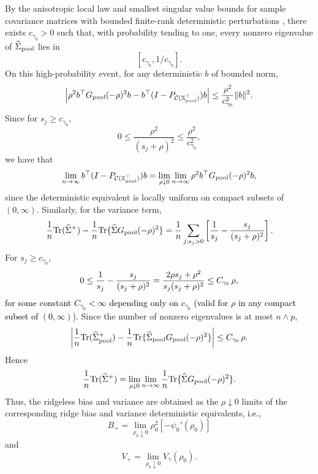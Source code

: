 \documentclass{article}
\theoremstyle{plain}
\theoremstyle{remark}
\def \Xm {\mathbb{X}_{\rm pool}}
\def \tr {\mathrm{Tr}}
\begin{document}


By the anisotropic local law \citep{knowles2017anisotropic} and smallest singular value bounds for sample covariance matrices with bounded finite-rank deterministic perturbations \citep{bai2010spectral}, there exists \(c_{\gamma_0}>0\) such that, with probability tending to one, every nonzero eigenvalue of \(\widehat\Sigma_{\rm pool}\) lies in
\[
[c_{\gamma_0},1/c_{\gamma_0}].
\]
On this high-probability event, for any deterministic $b$ of bounded norm,
\[
\left|
\rho^2 b^\top G_{\rm pool}(-\rho)^2b
-
b^\top(I-P_{\mathcal{C}(\textcolor{black}{\Xm^\top})})b
\right|
\le
\frac{\rho^2}{c_{\gamma_0}^2}\|b\|^2.
\]
Since for \(s_j\ge c_{\gamma_0}\),
\[
0\le
\frac{\rho^2}{(s_j+\rho)^2}
\le
\frac{\rho^2}{c_{\gamma_0}^2},
\]
we have that
\[
\lim_{n\to\infty}b^\top(I-P_{\mathcal{C}(\textcolor{black}{\Xm^\top})})b
=
\lim_{\rho\downarrow0}\lim_{n\to\infty}
\rho^2 b^\top G_{\rm pool}(-\rho)^2b,
\]
since the deterministic equivalent is locally uniform on compact subsets of $(0,\infty)$.
Similarly, for the variance term,
\[
\frac1n\tr(\widehat\Sigma^+)
-
\frac1n\tr\{\widehat\Sigma G_{\rm pool}(-\rho)^2\}
=
\frac1n\sum_{j:s_j>0}
\left[
\frac1{s_j}
-
\frac{s_j}{(s_j+\rho)^2}
\right].
\]
For \(s_j\ge c_{\gamma_0}\),
\[
0\le
\frac1{s_j}
-
\frac{s_j}{(s_j+\rho)^2}
=
\frac{2\rho s_j+\rho^2}{s_j(s_j+\rho)^2}
\le
\textcolor{black}{C_{\gamma_0}\,\rho,}
\]
\textcolor{black}{for some constant $C_{\gamma_0}<\infty$ depending only on $c_{\gamma_0}$ (valid for $\rho$ in any compact subset of $(0,\infty)$).} Since the number of nonzero eigenvalues is at most \(n\wedge p\),
\[
\left|
\frac1n\tr(\widehat\Sigma_{\rm pool}^+)
-
\frac1n\tr\{\widehat\Sigma_{\rm pool} G_{\rm pool}(-\rho)^2\}
\right|
\le
\textcolor{black}{C_{\gamma_0}\,\rho.}
\]
Hence
\[
\frac1n\tr(\widehat\Sigma^+)
=
\lim_{\rho\downarrow0}\lim_{n\to\infty}
\frac1n\tr\{\widehat\Sigma G_{\rm pool}(-\rho)^2\}.
\]
Thus, the ridgeless bias and variance are obtained as the \(\rho\downarrow0\) limits of the corresponding ridge bias and variance deterministic equivalents\textcolor{black}{, i.e.,}
\[
B_+
=
\lim_{\rho_0\downarrow0}
\rho_0^2[-\psi_0'(\rho_0)]
\]
 and 
\[
V_+
=
\lim_{\rho_0\downarrow0}
V_\gamma(\rho_0).
\]
\end{document}
